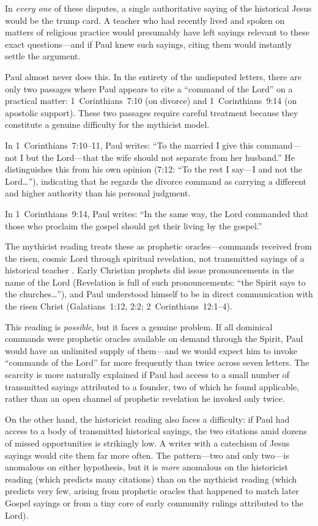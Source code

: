 \documentclass[12pt,oneside]{article}
\begin{document}
In \textit{every one} of these disputes, a single authoritative saying
of the historical Jesus would be the trump card.  A teacher who had
recently lived and spoken on matters of religious practice would
presumably have left sayings relevant to these exact questions---and if
Paul knew such sayings, citing them would instantly settle the argument.

Paul almost never does this.  In the entirety of the undisputed letters,
there are only two passages where Paul appears to cite a ``command of the
Lord'' on a practical matter: 1~Corinthians~7:10 (on divorce) and
1~Corinthians~9:14 (on apostolic support).  These two passages require
careful treatment because they constitute a genuine difficulty for the
mythicist model.

In 1~Corinthians~7:10--11, Paul writes: ``To the married I give this
command---not I but the Lord---that the wife should not separate from
her husband.''  He distinguishes this from his own opinion (7:12: ``To
the rest I say---I and not the Lord\ldots''), indicating that he regards
the divorce command as carrying a different and higher authority than
his personal judgment.

In 1~Corinthians~9:14, Paul writes: ``In the same way, the Lord
commanded that those who proclaim the gospel should get their living by
the gospel.''

The mythicist reading treats these as prophetic oracles---commands
received from the risen, cosmic Lord through spiritual revelation, not
transmitted sayings of a historical teacher \citep{Aune1983}.  Early
Christian prophets did issue pronouncements in the name of the Lord
(Revelation is full of such pronouncements: ``the Spirit says to the
churches\ldots''), and Paul understood himself to be in direct
communication with the risen Christ (Galatians~1:12, 2:2;
2~Corinthians~12:1--4).

This reading is \textit{possible}, but it faces a genuine problem.  If
all dominical commands were prophetic oracles available on demand through
the Spirit, Paul would have an unlimited supply of them---and we would
expect him to invoke ``commands of the Lord'' far more frequently than
twice across seven letters.  The scarcity is more naturally explained if
Paul had access to a small number of transmitted sayings attributed to
a founder, two of which he found applicable, rather than an open channel
of prophetic revelation he invoked only twice.

On the other hand, the historicist reading also faces a difficulty: if
Paul had access to a body of transmitted historical sayings, the two
citations amid dozens of missed opportunities is strikingly low.  A
writer with a catechism of Jesus sayings would cite them far more
often.  The pattern---two and only two---is anomalous on either
hypothesis, but it is \textit{more} anomalous on the historicist reading
(which predicts many citations) than on the mythicist reading (which
predicts very few, arising from prophetic oracles that happened to match
later Gospel sayings or from a tiny core of early community rulings
attributed to the Lord).
\end{document}
